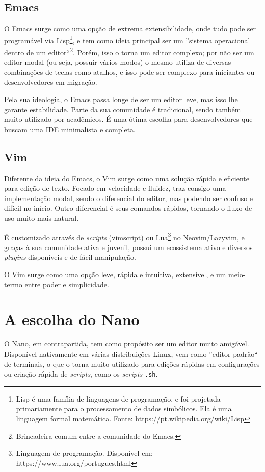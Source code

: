 \subsection{Emacs}

O Emacs surge como uma opção de extrema extensibilidade, onde tudo pode ser programável via Lisp\footnote{Lisp é uma família de linguagens de programação, e foi projetada primariamente para o processamento de dados simbólicos. Ela é uma linguagem formal matemática. Fonte: https://pt.wikipedia.org/wiki/Lisp}, e tem como ideia principal ser um ''sistema operacional dentro de um editor``\footnote{Brincadeira comum entre a comunidade do Emacs.}. Porém, isso o torna um editor complexo; por não ser um editor modal (ou seja, possuir vários modos) o mesmo utiliza de diversas combinações de teclas como atalhos, e isso pode ser complexo para iniciantes ou desenvolvedores em migração.

Pela sua ideologia, o Emacs passa longe de ser um editor leve, mas isso lhe garante estabilidade. Parte da sua comunidade é tradicional, sendo também muito utilizado por acadêmicos. É uma ótima escolha para desenvolvedores que buscam uma IDE minimalista e completa.

\subsection{Vim}

Diferente da ideia do Emacs, o Vim surge como uma solução rápida e eficiente para edição de texto. Focado em velocidade e fluidez, traz consigo uma implementação modal, sendo o diferencial do editor, mas podendo ser confuso e difícil no início. Outro diferencial é seus comandos rápidos, tornando o fluxo de uso muito mais natural.

É customizado através de \textit{scripts} (vimscript) ou Lua\footnote{Linguagem de programação. Disponível em: https://www.lua.org/portugues.html} no Neovim/Lazyvim, e graças à sua comunidade ativa e juvenil, possui um ecossistema ativo e diversos \textit{plugins} disponíveis e de fácil manipulação.

O Vim surge como uma opção leve, rápida e intuitiva, extensível, e um meio-termo entre poder e simplicidade.

\section{A escolha do Nano}

O Nano, em contrapartida, tem como propósito ser um editor muito amigável. Disponível nativamente em várias distribuições Linux, vem como ''editor padrão`` de terminais, o que o torna muito utilizado para edições rápidas em configurações ou criação rápida de \textit{scripts}, como os \textit{scripts} \texttt{.sh}.

